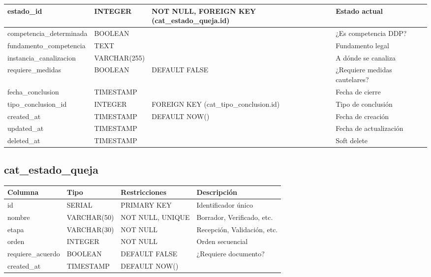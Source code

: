 \documentclass[12pt, a4paper]{article}
\begin{document}
\begin{longtable}{|p{3.5cm}|p{2.5cm}|p{3cm}|p{5cm}|}
    \hline
    estado\_id & INTEGER & NOT NULL, FOREIGN KEY (cat\_estado\_queja.id) & Estado actual \\
    \hline
    competencia\_determinada & BOOLEAN & & ¿Es competencia DDP? \\
    \hline
    fundamento\_competencia & TEXT & & Fundamento legal \\
    \hline
    instancia\_canalizacion & VARCHAR(255) & & A dónde se canaliza \\
    \hline
    requiere\_medidas & BOOLEAN & DEFAULT FALSE & ¿Requiere medidas cautelares? \\
    \hline
    fecha\_conclusion & TIMESTAMP & & Fecha de cierre \\
    \hline
    tipo\_conclusion\_id & INTEGER & FOREIGN KEY (cat\_tipo\_conclusion.id) & Tipo de conclusión \\
    \hline
    created\_at & TIMESTAMP & DEFAULT NOW() & Fecha de creación \\
    \hline
    updated\_at & TIMESTAMP & & Fecha de actualización \\
    \hline
    deleted\_at & TIMESTAMP & & Soft delete \\
    \hline
\end{longtable}

\subsection{cat\_estado\_queja}
\begin{longtable}{|p{3.5cm}|p{2.5cm}|p{3cm}|p{5cm}|}
    \hline
    \rowcolor[gray]{0.9}
    \textbf{Columna} & \textbf{Tipo} & \textbf{Restricciones} & \textbf{Descripción} \\
    \hline
    id & SERIAL & PRIMARY KEY & Identificador único \\
    \hline
    nombre & VARCHAR(50) & NOT NULL, UNIQUE & Borrador, Verificado, etc. \\
    \hline
    etapa & VARCHAR(30) & NOT NULL & Recepción, Validación, etc. \\
    \hline
    orden & INTEGER & NOT NULL & Orden secuencial \\
    \hline
    requiere\_acuerdo & BOOLEAN & DEFAULT FALSE & ¿Requiere documento? \\
    \hline
    created\_at & TIMESTAMP & DEFAULT NOW() & \\
    \hline
\end{longtable}
\end{document}
